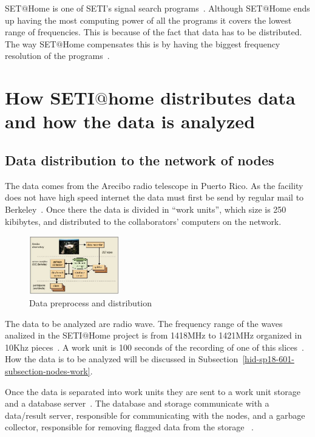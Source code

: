 SET$@$Home is one of SETI's signal search 
programs~\cite{hid-sp18-601-www-seti-programs}. Although SET$@$Home ends up 
having the most computing power of all the programs it covers the lowest range 
of frequencies. This is because of the fact that data has to be distributed. The 
way SET$@$Home compensates this is by having the biggest frequency resolution of 
the programs~\cite{hid-sp18-601-paper-korpela2001seti}. 
 
\section{How SETI$@$home distributes data and how the
data is analyzed}\label{hid-sp18-601-section-howworks}
\subsection{Data distribution to the network
of nodes}\label{hid-sp18-601-subsection-data-dist}
The data comes from the Arecibo radio telescope in Puerto Rico. As the facility
does not have high speed internet the data must first be send by regular mail to
 Berkeley~\cite{hid-sp18-601-www-sathome-howworks}. Once there the data is 
 divided in ``work units'', which size is 250 kibibytes, and distributed to the 
 collaborators' computers on the network.

\begin{figure}[!htb]
        \centering
        \includegraphics[width=0.35\textwidth]{figures/arecibo-to-net.jpg}
        \caption{Data preprocess and
        distribution~\cite{hid-sp18-601-paper-anderson2002seti}}\label{datasend}
\end{figure}

The data to be analyzed are radio wave. The frequency range of the waves 
analized in the SETI$@$Home project is from 1418MHz to 1421MHz organized in 
10Khz pieces~\cite{hid-sp18-601-paper-anderson2002seti}. A work unit is 100 
seconds of the recording of one of this 
slices~\cite{hid-sp18-601-www-sathome-howworks}. How the data is to be analyzed 
will be discussed in Subsection~\ref{hid-sp18-601-subsection-nodes-work}.

Once the data is separated into work units they are sent to a work 
unit storage and a database server~\cite{hid-sp18-601-book-foster1999carl}. 
The database and storage communicate with a data/result server, responsible for 
communicating with the nodes, and a garbage collector, responsible for 
removing flagged data from the 
storage
~\cite{hid-sp18-601-book-foster1999carl,hid-sp18-601-paper-anderson2002seti}.

